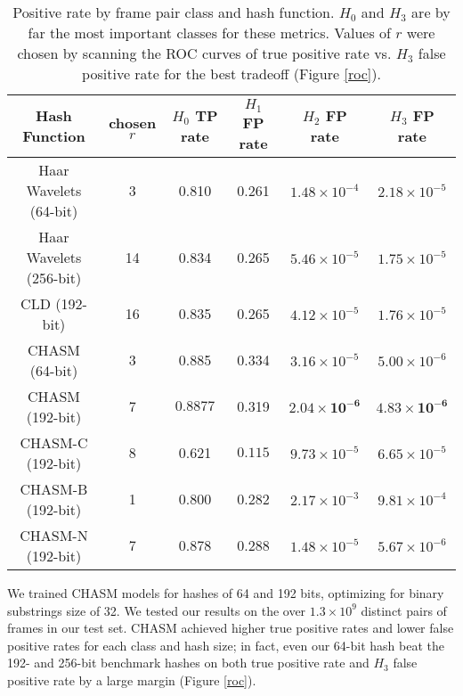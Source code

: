 \documentclass{article}
\begin{document}
\begin{multicols}{2}
\begin{table*}
\caption{Positive rate by frame pair class and hash function. $H_0$ and $H_3$ are by far the most important classes for these metrics. Values of $r$ were chosen by scanning the ROC curves of true positive rate vs. $H_3$ false positive rate for the best tradeoff (Figure \ref{roc}).}
\begin{small}\begin{sc}\begin{center}
\begin{tabular}{|c|c|c|c|c|c|}
\hline
Hash Function & chosen $r$ & $H_0$ TP rate & $H_1$ FP rate & $H_2$ FP rate & $H_3$ FP rate \\ \hline
Haar Wavelets (64-bit) & 3 & 0.810 & 0.261 & $1.48\times10^{-4}$ & $2.18\times10^{-5}$ \\
Haar Wavelets (256-bit) & 14 & 0.834 & 0.265 & $5.46\times10^{-5}$ & $1.75\times10^{-5}$ \\
CLD (192-bit) & 16 & 0.835 & 0.265 & $4.12\times10^{-5}$ & $1.76\times10^{-5}$ \\
CHASM (64-bit) & 3 & 0.885 & 0.334 & $3.16\times10^{-5}$ & $5.00\times10^{-6}$ \\
CHASM (192-bit) & 7 & $\mathbf{0.8877}$ & 0.319 & $\mathbf{2.04\times10^{-6}}$ & $\mathbf{4.83\times10^{-6}}$ \\
CHASM-C (192-bit) & 8 & 0.621 & $\mathbf{0.115}$ & $9.73\times10^{-5}$ & $6.65\times10^{-5}$ \\
CHASM-B (192-bit) & 1 & 0.800 & 0.282 & $2.17\times10^{-3}$ & $9.81\times10^{-4}$ \\
CHASM-N (192-bit) & 7 & 0.878 & 0.288 & $1.48\times10^{-5}$ & $5.67\times10^{-6}$ \\
\hline
\end{tabular}
\end{center}\end{sc}\end{small}
\label{losses}
\end{table*}

We trained CHASM models for hashes of 64 and 192 bits, optimizing for binary substrings size of 32.
We tested our results on the over $1.3\times10^9$ distinct pairs of frames in our test set.
CHASM achieved higher true positive rates and lower false positive rates for each class and hash size; in fact, even our 64-bit hash beat the 192- and 256-bit benchmark hashes on both true positive rate and $H_3$ false positive rate by a large margin (Figure \ref{roc}).


\end{multicols}
\end{document}
